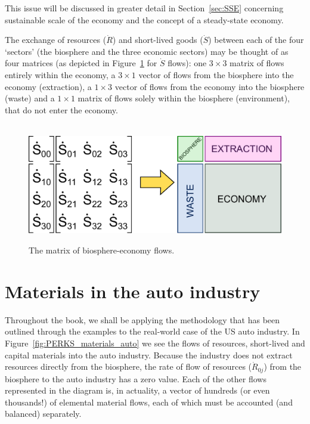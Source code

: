 \noindent{}This issue will be discussed in greater detail
in Section~\ref{sec:SSE} concerning 
sustainable scale of the economy and
the concept of a steady-state economy.

The exchange of resources ($\dot{R}$) and 
short-lived goods ($\dot{S}$) between 
each of the four `sectors' 
(the biosphere and 
the three economic sectors) 
may be thought of as four matrices 
(as depicted in Figure~\ref{fig:C_mat_matrix} 
for $\dot{S}$ flows): 
one $3\times3$ matrix of flows 
entirely within the economy, 
a $3\times1$ vector of flows from the 
biosphere into the economy (extraction), 
a $1\times3$ vector of flows from the economy 
into the biosphere (waste) 
and a $1\times1$ matrix of flows 
solely within the biosphere (environment), 
that do not enter the economy.

\begin{figure}[!ht]
\centering\
\includegraphics[width=0.8\linewidth]{Part_1/Chapter_Materials/images/Matrix.pdf}
\caption[The matrix of biosphere\index{biosphere}-economy flows.]{The matrix of biosphere-economy flows. 
}
\label{fig:C_mat_matrix}
\end{figure}

\section{Materials in the auto industry}
\label{sec:materials_auto}

Throughout the book, we shall be applying the methodology
that has been outlined through the examples to the
real-world case of the US auto industry.
In Figure~\ref{fig:PERKS_materials_auto}
we see the flows of resources,
short-lived and capital materials
into the auto industry.
Because the industry does not
extract resources directly from the biosphere,
the rate of flow of resources ($\dot{R}_{0j}$) 
from the biosphere to the auto industry 
has a zero value.
Each of the other flows represented in the diagram is,
in actuality,
a vector of hundreds (or even thousands!)
of elemental material flows,
each of which must be accounted 
(and balanced) separately.


